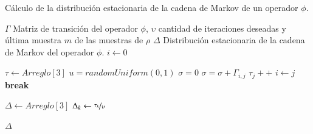 \begin{algorithm}[!ht]
	\caption{Cálculo de la distribución estacionaria de la cadena de Markov de un operador $\phi$.}
	\label{alg:distEstacionaria}
	\begin{algorithmic}[1]
	\REQUIRE $\Gamma$ Matriz de transición del operador $\phi$, $\upsilon$ cantidad de iteraciones deseadas y última muestra $m$ de las muestras de $\rho$
	\ENSURE $\Delta$ Distribución estacionaria de la cadena de Markov del operador $\phi$.
	\STATE $i \leftarrow 0$ 
	\ELSE
	\ENDIF
	
	\STATE $\tau \leftarrow Arreglo[3]$ 
		\STATE $u = randomUniform(0,1)$
		\STATE $\sigma = 0$
			\STATE $\sigma = \sigma + \Gamma_{i,j}$
				\STATE $\tau_{j}++$
				\STATE $i \leftarrow j$
				\STATE \textbf{break}
			\ENDIF
		\ENDFOR
	\ENDFOR

	\STATE $\Delta \leftarrow Arreglo[3]$ 
		\STATE $\Delta_{k} \leftarrow \nicefrac{\tau_{k}}{\upsilon}$
	\ENDFOR	
	
	\RETURN $\Delta$
	
	\end{algorithmic}
\end{algorithm}


